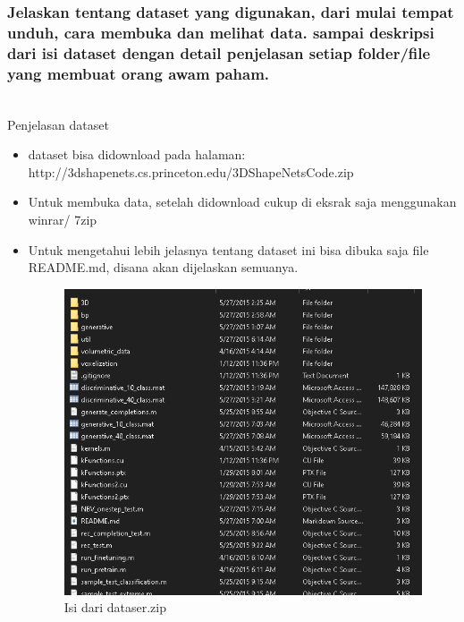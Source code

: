 \subsubsection{Jelaskan tentang dataset yang digunakan, dari mulai tempat unduh, cara membuka dan melihat data. sampai deskripsi dari isi dataset dengan detail penjelasan setiap folder/file yang membuat orang awam paham.}
\hfill\\
Penjelasan dataset
\begin{itemize}
	\item dataset bisa didownload pada halaman: http://3dshapenets.cs.princeton.edu/3DShapeNetsCode.zip
	\item Untuk membuka data, setelah didownload cukup di eksrak saja menggunakan winrar/ 7zip
	\item Untuk mengetahui lebih jelasnya tentang dataset ini bisa dibuka saja file README.md, disana akan dijelaskan semuanya.
\begin{figure}[H]
	\centering
	\includegraphics[scale=0.5]{figures/1174070/8/3dsnap.png}
	\caption{Isi dari dataser.zip}
\end{figure}

\end{itemize}

